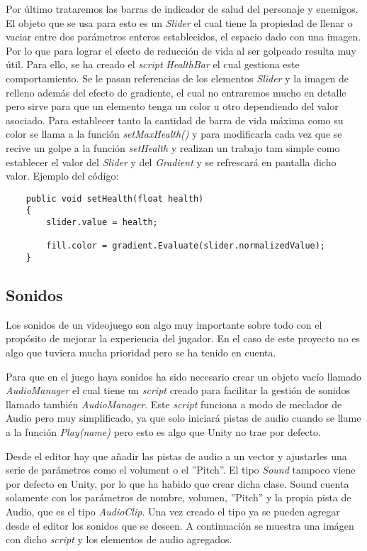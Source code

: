 Por último trataremos las barras de indicador de salud del personaje y enemigos. El objeto que se usa para esto es un  \textit{Slider} el cual tiene la propiedad de llenar o vaciar entre dos parámetros enteros establecidos, el espacio dado con una imagen. Por lo que para lograr el efecto de reducción de vida al ser golpeado resulta muy útil. Para ello, se ha creado el \textit{script} \textit{HealthBar} el cual gestiona este comportamiento. Se le pasan referencias de los elementos \textit{Slider} y la imagen de relleno además del efecto de gradiente, el cual no entraremos mucho en detalle pero sirve para que un elemento tenga un color u otro dependiendo del valor asociado. Para establecer tanto la cantidad de barra de vida máxima como su color se llama a la función \textit{setMaxHealth()} y para modificarla cada vez que se recive un golpe a la función \textit{setHealth} y realizan un trabajo tam simple como establecer el valor del \textit{Slider} y del \textit{Gradient} y se refrescará en pantalla dicho valor. Ejemplo del código: 

\begin{lstlisting}
    public void setHealth(float health)
    {
        slider.value = health;

        fill.color = gradient.Evaluate(slider.normalizedValue);
    }
\end{lstlisting}

\subsection{Sonidos}

Los sonidos de un videojuego son algo muy importante sobre todo con el propósito de mejorar la experiencia del jugador. En el caso de este proyecto no es algo que tuviera mucha prioridad pero se ha tenido en cuenta. 

Para que en el juego haya sonidos ha sido necesario crear un objeto vacío llamado \textit{AudioManager} el cual tiene un \textit{script} creado para facilitar la gestión de sonidos llamado también \textit{AudioManager}. Este \textit{script} funciona a modo de meclador de Audio pero muy simplificado, ya que solo iniciará pistas de audio cuando se llame a la función \textit{Play(name)} pero esto es algo que Unity no trae por defecto.

Desde el editor hay que añadir las pistas de audio a un vector y ajustarles una serie de parámetros como el volument o el ''Pitch''. El tipo \textit{Sound} tampoco viene por defecto en Unity, por lo que ha habido que crear dicha clase. Sound cuenta solamente con los parámetros de nombre, volumen, ''Pitch'' y la propia pista de Audio, que es el tipo \textit{AudioClip}. Una vez creado el tipo ya se pueden agregar desde el editor los sonidos que se deseen. A continuación se muestra una imágen con dicho \textit{script} y los elementos de audio agregados.

